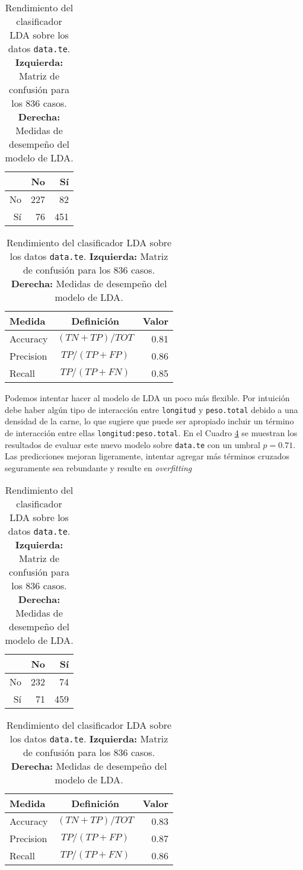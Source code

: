 \documentclass[a4paper]{article}\usepackage[]{graphicx}\usepackage[]{color}
\begin{document}
\begin{table}[ht]
\centering
\begin{tabular}{rrr}
  \hline
 & No & Sí \\ 
  \hline
No & 227 &  82 \\ 
  Sí &  76 & 451 \\ 
   \hline
\end{tabular}
\hspace{4cm}
\begin{tabular}{l c r}
\hline
Medida 				& Definición		& Valor\\
\hline
Accuracy 			& $(TN+TP)/TOT$ & 0.81\\
Precision 			& $TP/(TP+FP)$  & 0.86 \\
Recall 				& $TP/(TP+FN)$  & 0.85\\
\hline
\end{tabular}
\caption{Rendimiento del clasificador LDA sobre los datos \texttt{\textcolor{BurntOrange}{data.te}}. \textbf{Izquierda:} Matriz de confusión para los 836 casos. \textbf{Derecha:} Medidas de desempeño del modelo de LDA.} 
\label{tab:LDAconf}
\end{table}
              
Podemos intentar hacer al modelo de LDA un poco más flexible. Por intuición debe haber algún tipo de interacción entre \texttt{\textcolor{BurntOrange}{longitud}} y \texttt{\textcolor{BurntOrange}{peso.total}} debido a una densidad de la carne, lo que sugiere que puede ser apropiado incluir un término de interacción entre ellas \texttt{\textcolor{BurntOrange}{longitud:peso.total}}. En el Cuadro \ref{tab:LDAconf2} se muestran los resultados de evaluar este nuevo modelo sobre \texttt{\textcolor{BurntOrange}{data.te}} con un umbral $p=0.71$. Las predicciones mejoran ligeramente, intentar agregar más términos cruzados seguramente sea rebundante y resulte en \textit{overfitting} 






\begin{table}[ht]
\centering
\begin{tabular}{rrr}
  \hline
 & No & Sí \\ 
  \hline
No & 232 &  74 \\ 
  Sí &  71 & 459 \\ 
   \hline
\end{tabular}
\hspace{4cm}
\begin{tabular}{l c r}
\hline
Medida 				& Definición		& Valor\\
\hline
Accuracy 			& $(TN+TP)/TOT$ & 0.83\\
Precision 			& $TP/(TP+FP)$  & 0.87 \\
Recall 				& $TP/(TP+FN)$  & 0.86\\
\hline
\end{tabular}
\caption{Rendimiento del clasificador LDA sobre los datos \texttt{\textcolor{BurntOrange}{data.te}}. \textbf{Izquierda:} Matriz de confusión para los 836 casos. \textbf{Derecha:} Medidas de desempeño del modelo de LDA.} 
\label{tab:LDAconf2}
\end{table}
\end{document}
